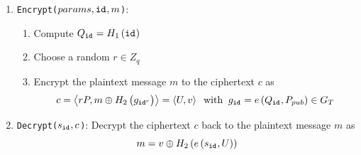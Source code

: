 \begin{algorithm}
\begin{enumerate}
\begin{enumerate}
   \end{enumerate}
   \item \texttt{Encrypt($params, \mathtt{id}_{}, m$)}:
   \begin{enumerate}
    \item Compute $Q_{\mathtt{id}_{}} = H_1 \left( \mathtt{id}_{} \right)$
    \item Choose a random $r \in Z_q$
    \item Encrypt the plaintext message $m$ to the ciphertext $c$ as
    \begin{equation*}
     c = \left< rP, m \oplus H_2 \left( g_{\mathtt{id}_{}^r} \right) \right> = \left< U, v \right> \; \; \textrm{with} \; \; g_{\mathtt{id}_{}} = e \left( Q_{\mathtt{id}_{}}, P_{pub} \right) \in G_T
    \end{equation*}
   \end{enumerate}
   \item \texttt{Decrypt($s_{\mathtt{id}_{}}, c$)}: Decrypt the ciphertext $c$ back to the plaintext message $m$ as
   \begin{equation*}
    m = v \oplus H_2 \left( e \left( s_{\mathtt{id}_{}}, U \right) \right)
   \end{equation*}
 \end{enumerate}
\end{algorithm}

